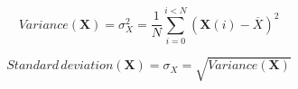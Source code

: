 \documentclass[english,a4paper,12pt,oneside]{article}
\begin{document}
\begin{equation}
 Variance(\mathbf{X}) = \sigma^2_X = \frac{1}{N}\sum_{i=0}^{i < N}\left(\mathbf{X}(i) - \overline{X}\right)^2
\end{equation}

\begin{equation}
 Standard\,deviation(\mathbf{X}) = \sigma_X = \sqrt{Variance(\mathbf{X})}
 \label{eq:std dev}
\end{equation}



% 





% 
% 
% 
\end{document}
